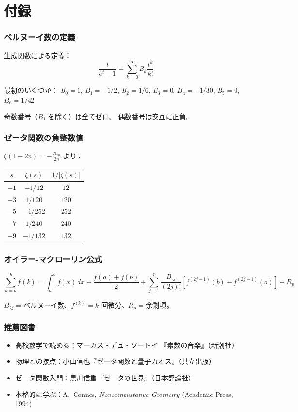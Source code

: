 \documentclass[11pt,a4paper]{article}
\begin{document}
\newpage

\appendix
\part*{付録}

\section{ベルヌーイ数の定義}

生成関数による定義：
$$\frac{t}{e^t - 1} = \sum_{k=0}^{\infty} B_k \frac{t^k}{k!}$$

最初のいくつか：
$B_0 = 1$, $B_1 = -1/2$, $B_2 = 1/6$, $B_3 = 0$, $B_4 = -1/30$, $B_5 = 0$, $B_6 = 1/42$

奇数番号（$B_1$ を除く）は全てゼロ。
偶数番号は交互に正負。

\section{ゼータ関数の負整数値}

$\zeta(1-2n) = -\frac{B_{2n}}{2n}$ より：

\begin{center}
\begin{tabular}{c|c|c}
$s$ & $\zeta(s)$ & $1/|\zeta(s)|$ \\
\hline
$-1$ & $-1/12$ & $12$ \\
$-3$ & $1/120$ & $120$ \\
$-5$ & $-1/252$ & $252$ \\
$-7$ & $1/240$ & $240$ \\
$-9$ & $-1/132$ & $132$
\end{tabular}
\end{center}

\section{オイラー-マクローリン公式}

$$\sum_{k=a}^{b} f(k) = \int_a^b f(x)\,dx + \frac{f(a)+f(b)}{2} + \sum_{j=1}^{p} \frac{B_{2j}}{(2j)!}\left[f^{(2j-1)}(b) - f^{(2j-1)}(a)\right] + R_p$$

$B_{2j}$ = ベルヌーイ数、$f^{(k)}$ = $k$ 回微分、$R_p$ = 余剰項。

\section{推薦図書}

\begin{itemize}
\item 高校数学で読める：マーカス・デュ・ソートイ
『素数の音楽』（新潮社）
\item 物理との接点：小山信也『ゼータ関数と量子カオス』（共立出版）
\item ゼータ関数入門：黒川信重『ゼータの世界』（日本評論社）
\item 本格的に学ぶ：A.\ Connes, \textit{Noncommutative Geometry}
(Academic Press, 1994)
\end{itemize}
\end{document}
